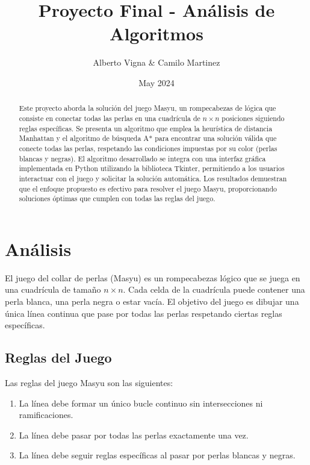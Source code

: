 \documentclass{article}
\title{Proyecto Final - Análisis de Algoritmos}
\author{Alberto Vigna \& Camilo Martinez}
\date{May 2024}
\begin{document}
\maketitle

\begin{abstract}
Este proyecto aborda la solución del juego Masyu, un rompecabezas de lógica que consiste en conectar todas las perlas en una cuadrícula de \( n \times n \) posiciones siguiendo reglas específicas. Se presenta un algoritmo que emplea la heurística de distancia Manhattan y el algoritmo de búsqueda A* para encontrar una solución válida que conecte todas las perlas, respetando las condiciones impuestas por su color (perlas blancas y negras). El algoritmo desarrollado se integra con una interfaz gráfica implementada en Python utilizando la biblioteca Tkinter, permitiendo a los usuarios interactuar con el juego y solicitar la solución automática. Los resultados demuestran que el enfoque propuesto es efectivo para resolver el juego Masyu, proporcionando soluciones óptimas que cumplen con todas las reglas del juego.
\end{abstract}

\section{Análisis}

El juego del collar de perlas (Masyu) es un rompecabezas lógico que se juega en una cuadrícula de tamaño \( n \times n \). Cada celda de la cuadrícula puede contener una perla blanca, una perla negra o estar vacía. El objetivo del juego es dibujar una única línea continua que pase por todas las perlas respetando ciertas reglas específicas.

\subsection{Reglas del Juego}

Las reglas del juego Masyu son las siguientes:

\begin{enumerate}
    \item La línea debe formar un único bucle continuo sin intersecciones ni ramificaciones.
    \item La línea debe pasar por todas las perlas exactamente una vez.
    \item La línea debe seguir reglas específicas al pasar por perlas blancas y negras.
\end{enumerate}
\end{document}

